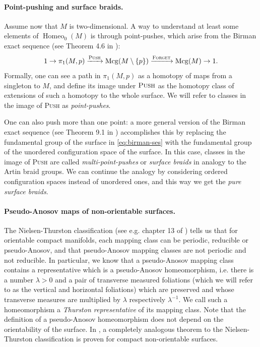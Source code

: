 \documentclass[a4paper]{article}
\begin{document}
\paragraph{Point-pushing and surface braids.}
Assume now that $M$ is two-dimensional.
A way to understand at least some elements of $\operatorname{Homeo}_0(M)$ is through point-pushes, which arise from the Birman exact sequence (see Theorem 4.6 in \cite{primer}):
\begin{equation}\label{eq:birman-ses} 1 \rightarrow \pi_1(M,p) \xrightarrow{\textsc{Push}} \operatorname{Mcg}(M\setminus \{p\}) \xrightarrow{\textsc{Forget}} \operatorname{Mcg}(M) \rightarrow 1 .\end{equation}
Formally, one can see a path in $\pi_1(M,p)$ as a homotopy of maps from a singleton to $M$, and define its image under $\textsc{Push}$ as the homotopy class of extensions of such a homotopy to the whole surface.
We will refer to classes in the image of \textsc{Push} as \emph{point-pushes}.

One can also push more than one point:
a more general version of the Birman exact sequence (see Theorem 9.1 in \cite{primer}) accomplishes this by replacing the fundamental group of the surface in \eqref{eq:birman-ses} with the fundamental group of the unordered configuration space of the surface.
In this case, classes in the image of \textsc{Push} are called \emph{multi-point-pushes} or \emph{surface braids} in analogy to the Artin braid groups.
We can continue the analogy by considering ordered configuration spaces instead of unordered ones, and this way we get the \emph{pure surface braids}.

\paragraph{Pseudo-Anosov maps of non-orientable surfaces.}
The Nielsen-Thurston classification (see e.g. chapter 13 of \cite{primer}) tells us that for orientable compact manifolds, each mapping class can be periodic, reducible or pseudo-Anosov, and that pseudo-Anosov mapping classes are not periodic and not reducible.
In particular, we know that a pseudo-Anosov mapping class contains a representative which is a pseudo-Anosov homeomorphism, i.e. there is a number $\lambda > 0$ and a pair of transverse measured foliations (which we will refer to as the vertical and horizontal foliations) which are preserved and whose transverse measures are multiplied by $\lambda$ respectively $\lambda^{-1}$.
We call such a homeomorphism a \emph{Thurston representative} of its mapping class.
Note that the definition of a pseudo-Anosov homeomorphism does not depend on the orientability of the surface.
In \cite{wu}, a completely analogous theorem to the Nielsen-Thurston classification is proven for compact non-orientable surfaces.
\end{document}
